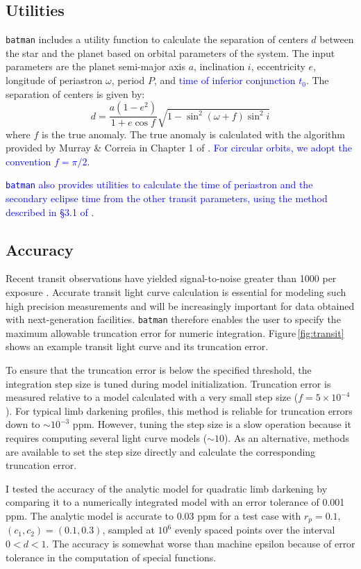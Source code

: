 \documentclass[12pt,preprint]{aastex}
\newcommand*{\blue}{\textcolor{blue}}
\begin{document}
\subsection{Utilities}
\texttt{batman} includes a utility function to calculate the separation of centers $d$ between the star and the planet based on orbital parameters of the system.  The input parameters are the planet semi-major axis $a$, inclination $i$, eccentricity $e$, longitude of periastron $\omega$, period $P$, and \blue{time of inferior conjunction $t_0$}.  The separation of centers is given by:
$$
d = \frac{a(1-e^2)}{1+e\cos{f}}\sqrt{1-\sin^2{(\omega+f)}\sin^2{i}}
$$
where $f$ is the true anomaly.  The true anomaly is calculated with the algorithm provided by Murray \& Correia in Chapter 1 of \cite{seager10}. \blue{For circular orbits, we adopt the convention $f = \pi/2$.} 

\blue{\texttt{batman} also provides utilities to calculate the time of periastron and the secondary eclipse time from the other transit parameters, using the method described in \S 3.1 of \cite{eastman13}.}

\subsection{Accuracy}
Recent transit observations have yielded signal-to-noise greater than 1000 per exposure \citep[e.g.][]{kreidberg14a, knutson14b}.  Accurate transit light curve calculation is essential for modeling such high precision measurements and will be increasingly important for data obtained with next-generation facilities.  \texttt{batman} therefore enables the user to specify the maximum allowable truncation error for numeric integration.  Figure\,\ref{fig:transit} shows an example transit light curve and its truncation error.

To ensure that the truncation error is below the specified threshold, the integration step size is tuned during model initialization.  Truncation error is measured relative to a model calculated with a very small step size ($f = 5\times10^{-4}$).  For typical limb darkening profiles, this method is reliable for truncation errors down to $\sim 10^{-3}$ ppm. However, tuning the step size is a slow operation because it requires computing several light curve models ($\sim10$). As an alternative, methods are available to set the step size directly and calculate the corresponding truncation error. 

I tested the accuracy of the analytic model for quadratic limb darkening by comparing it to a numerically integrated model with an error tolerance of 0.001 ppm.  The analytic model is accurate to 0.03 ppm for a test case with $r_p = 0.1$, $(c_1, c_2) = (0.1, 0.3)$, sampled at $10^6$ evenly spaced points over the interval $0 < d < 1$.  The accuracy is somewhat worse than machine epsilon because of error tolerance in the computation of special functions.
\end{document}
